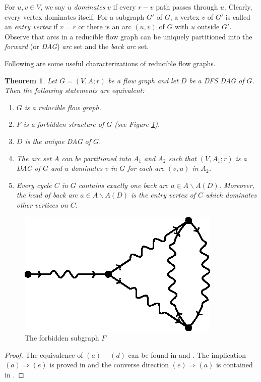 \documentclass[11pt]{article}
\newtheorem{theorem}{Theorem}[section]
\begin{document}
For $u,v\in V$, we say $u$ \emph{dominates} $v$ if every $r-v$ path passes through $u$. Clearly, every vertex dominates itself. For a subgraph $G'$ of $G$, a vertex $v$ of $G'$ is called an \emph{entry vertex} if $v=r$ or there is an arc $(u,v)$ of $G$ with $u$ outside $G'$.  Observe that arcs in a reducible flow graph can be uniquely partitioned into the \emph{forward} (or \emph{DAG}) \emph{arc} set and the \emph{back arc} set.

Following are some useful characterizations of reducible flow graphs.
\begin{theorem}
\label{thm:1}
Let $G=(V,A;r)$ be a flow graph and let $D$ be a DFS DAG of $G$. Then the following statements are equivalent:
\begin{enumerate}[label=\emph{(}\alph*\emph{)}]
  \item $G$ is a reducible flow graph.
  \item $F$ is a forbidden structure of $G$ (see Figure \ref{fig:1}).
  \item $D$ is the unique DAG of $G$.
  \item The arc set $A$ can be partitioned into $A_1$ and $A_2$ such that $(V,A_1;r)$ is a DAG of $G$ and $u$ dominates $v$ in $G$ for each arc $(v,u)$ in $A_2$.
  \item Every cycle $C$ in $G$ contains exactly one back arc $a\in A\backslash A(D)$. Moreover, the head of back arc $a\in A\backslash A(D)$ is the entry vertex of $C$ which dominates other vertices on $C$.
\end{enumerate}
\end{theorem}

\begin{figure}
\centering
\includegraphics{FASPacking-fig1.eps}
\caption{The forbidden subgraph $F$}
\label{fig:1}
\end{figure}

\begin{proof}
The equivalence of $(a)-(d)$ can be found in \cite{HecU1} and \cite{HecU2}. The implication $(a)\Rightarrow (e)$ is proved in \cite{Sham} and the converse direction $(e)\Rightarrow (a)$ is contained in \cite{CheZ}.
\end{proof}
\end{document}
